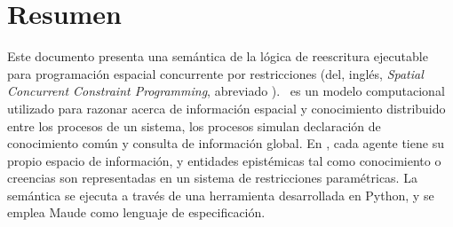 
\chapter*{Resumen}

Este documento presenta una sem\'antica de la l\'ogica de reescritura ejecutable para programaci\'on espacial concurrente por restricciones (del, ingl\'es, \textit{Spatial Concurrent Constraint Programming}, abreviado \SCCP). \SCCP \ es un modelo computacional utilizado para razonar acerca de informaci\'on espacial y conocimiento distribuido entre los procesos de un sistema, los procesos simulan declaraci\'on de conocimiento com\'un  y consulta de informaci\'on global. En \SCCP, cada agente tiene su propio espacio de informaci\'on, y entidades epist\'emicas tal como conocimiento o creencias son representadas en un sistema de restricciones param\'etricas. La sem\'antica se ejecuta a trav\'es de una herramienta desarrollada en Python, y se emplea Maude como lenguaje de especificaci\'on.